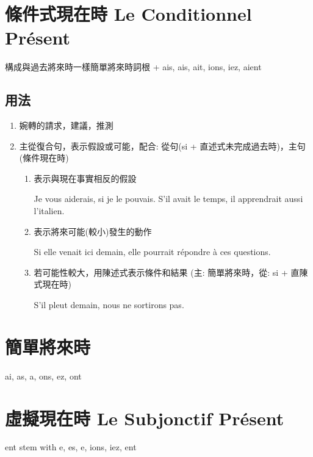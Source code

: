 \documentclass{book}
\begin{document}
    \section{條件式現在時 Le Conditionnel Présent}
        構成與過去將來時一樣簡單將來時詞根 + ais, ais, ait, ions, iez, aient
        
        \subsection{用法}
            \begin{enumerate}
                \item 婉轉的請求，建議，推測
                \item 主從復合句，表示假設或可能，配合: 從句(si + 直述式未完成過去時)，主句(條件現在時)
                \begin{enumerate}
                    \item 表示與現在事實相反的假設
                        \begin{center}
                            Je vous aiderais, si je le pouvais. S'il avait le temps, il apprendrait aussi l'italien.
                        \end{center}
                    \item 表示將來可能(較小)發生的動作
                        \begin{center}
                            Si elle venait ici demain, elle pourrait répondre à ces questions.
                        \end{center}
                    \item 若可能性較大，用陳述式表示條件和結果 (主: 簡單將來時，從: si + 直陳式現在時)
                        \begin{center}
                            S'il pleut demain, nous ne sortirons pas.
                        \end{center}
                \end{enumerate}
            \end{enumerate}

    \section{簡單將來時}
        ai, as, a, ons, ez, ont

    \section{虛擬現在時 Le Subjonctif Présent}
        ent stem with e, es, e, ions, iez, ent
\end{document}

